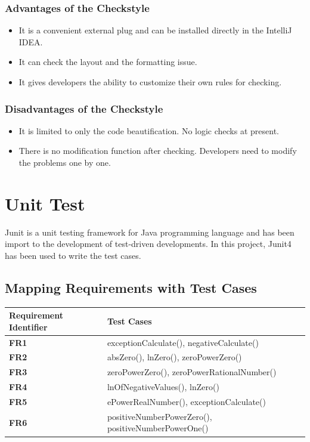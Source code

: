 \documentclass[11pt]{article}
\begin{document}
\subsubsection{Advantages of the Checkstyle}
\begin{center}
    \begin{itemize}
        \item It is a convenient external plug and can be installed directly in the IntelliJ IDEA. 
        \item It can check the layout and the formatting issue.
        \item It gives developers the ability to customize their own rules for checking.
    \end{itemize}
\end{center}

\subsubsection{Disadvantages of the Checkstyle}
\begin{center}
    \begin{itemize}
        \item It is limited to only the code beautification. No logic checks at present.
        \item There is no modification function after checking. Developers need to modify the problems one by one.
    \end{itemize}
\end{center}

\section{Unit Test}
Junit is a unit testing framework for Java programming language and has been import to the development of test-driven developments. In this project, Junit4 has been used to write the test cases.
\subsection{Mapping Requirements with Test Cases}
\begin{center}
\begin{tabular}{|p{5cm}|p{10cm}|}
\hline
     \textbf{Requirement Identifier} & \textbf{Test Cases}\\ \hline
      \textbf{FR1} & exceptionCalculate(), negativeCalculate()\\ \hline
      \textbf{FR2} & absZero(), lnZero(), zeroPowerZero() \\ \hline
      \textbf{FR3} & zeroPowerZero(), zeroPowerRationalNumber() \\ \hline
      \textbf{FR4} & lnOfNegativeValues(), lnZero() \\ \hline
      \textbf{FR5} & ePowerRealNumber(), exceptionCalculate()\\\hline
      \textbf{FR6} & positiveNumberPowerZero(), positiveNumberPowerOne()\\ \hline
\end{tabular}
\end{center}
\end{document}
